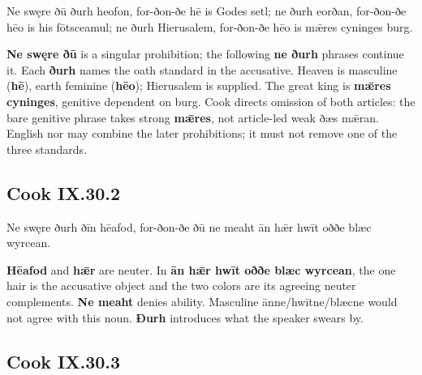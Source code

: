 \par\begin{minipage}{\linewidth}\raggedright
Ne swęre ðū ðurh heofon, for-ðon-ðe hē is Godes setl; ne ðurh eorðan, for-ðon-ðe hēo is his fōtsceamul; ne ðurh Hierusalem, for-ðon-ðe hēo is mǣres cyninges burg.

\textbf{Ne swęre ðū} is a singular prohibition; the following \textbf{ne ðurh} phrases continue it. Each \textbf{ðurh} names the oath standard in the accusative. Heaven is masculine (\textbf{hē}), earth feminine (\textbf{hēo}); Hierusalem is supplied. The great king is \textbf{mǣres cyninges}, genitive dependent on burg. Cook directs omission of both articles: the bare genitive phrase takes strong \textbf{mǣres}, not article-led weak ðæs mǣran. English nor may combine the later prohibitions; it must not remove one of the three standards.

\end{minipage}\par\addvspace{4pt}

\subsection*{Cook IX.30.2}

\par\begin{minipage}{\linewidth}\raggedright
Ne swęre ðurh ðīn hēafod, for-ðon-ðe ðū ne meaht ān hǣr hwīt oððe blæc wyrcean.

\textbf{Hēafod} and \textbf{hǣr} are neuter. In \textbf{ān hǣr hwīt oððe blæc wyrcean}, the one hair is the accusative object and the two colors are its agreeing neuter complements. \textbf{Ne meaht} denies ability. Masculine ānne/\allowbreak{}hwītne/\allowbreak{}blæcne would not agree with this noun. \textbf{Ðurh} introduces what the speaker swears by.

\end{minipage}\par\addvspace{4pt}

\subsection*{Cook IX.30.3}

